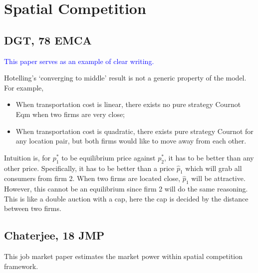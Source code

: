 \documentclass{book}
\theoremstyle{plain}
\theoremstyle{definition}
\begin{document}
\chapter{Spatial Competition} %
\label{cha:spatial_competition}


\section{DGT, 78 EMCA} %
\label{sec:dgt_78_emca}


\textbf{}

\textcolor{blue}{This paper serves as an example of clear writing.}

Hotelling's `converging to middle' result is not a generic property of the model.
For example, 
\begin{itemize}
	\item When transportation cost is linear, there exists no pure strategy Cournot Eqm when two firms are very close;
	\item When transportation cost is quadratic, there exists pure strategy Cournot for any location pair, but both firms would like to move away from each other.
\end{itemize}

Intuition is, for $p_1^*$ to be equilibrium price against $p_2^*$, it has to be better than any other price.
Specifically, it has to be better than a price $\hat p_1$ which will grab all consumers from firm 2.
When two firms are located close, $\hat p_1$ will be attractive.
However, this cannot be an equilibrium since firm 2 will do the same reasoning.
This is like a double auction with a cap, here the cap is decided by the distance between two firms.




\section{Chaterjee, 18 JMP} %
\label{sec:chaterjee_18_jmp}

\textbf{}

This job market paper estimates the market power within spatial competition framework.
\end{document}
